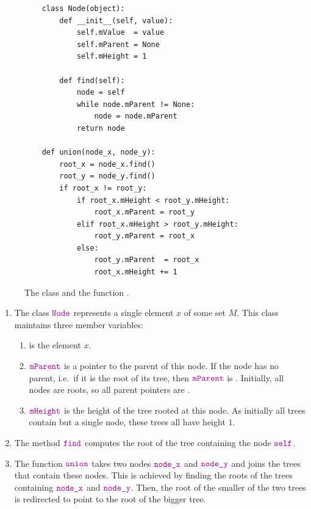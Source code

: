 \begin{figure}[!ht]
\centering
\begin{verbatim}
    class Node(object):
        def __init__(self, value):
            self.mValue  = value
            self.mParent = None
            self.mHeight = 1
    
        def find(self):
            node = self
            while node.mParent != None:
                node = node.mParent
            return node
    
    def union(node_x, node_y):
        root_x = node_x.find()
        root_y = node_y.find()
        if root_x != root_y:
            if root_x.mHeight < root_y.mHeight:
                root_x.mParent = root_y
            elif root_x.mHeight > root_y.mHeight:
                root_y.mParent = root_x
            else:
                root_y.mParent  = root_x
                root_x.mHeight += 1       
\end{verbatim}
\vspace*{-0.3cm}
\caption{The class  and the function .}
\label{fig:Union-Find-OO.ipynb}
\end{figure}

\begin{enumerate}
\item The class $\mytt{Node}$ represents a single element $x$ of some set $M$.  This
      class maintains three member variables:
      \begin{enumerate}
      \item {} is the element $x$.
      \item $\mytt{mParent}$ is a pointer to the parent of this node.  If the node has no parent,
             i.e.~if it is the root of its tree, then $\mytt{mParent}$ is .
             Initially, all nodes are roots, so all parent pointers are .
      \item $\mytt{mHeight}$ is the height of the tree rooted at this node.  As initially all trees contain but
            a single node, these trees all have height $1$.
      \end{enumerate}
\item The method $\mytt{find}$ computes the root of the
      tree containing the node $\mytt{self}$. 
\item The function $\mytt{union}$ takes two nodes $\mytt{node\_x}$ and $\mytt{node\_y}$ and joins the trees that
      contain these nodes.  This is achieved by finding the roots of the trees containing $\mytt{node\_x}$ and
      $\mytt{node\_y}$.
      Then, the root of the smaller of the two trees is redirected to point to
      the root of the bigger tree.
\end{enumerate}


